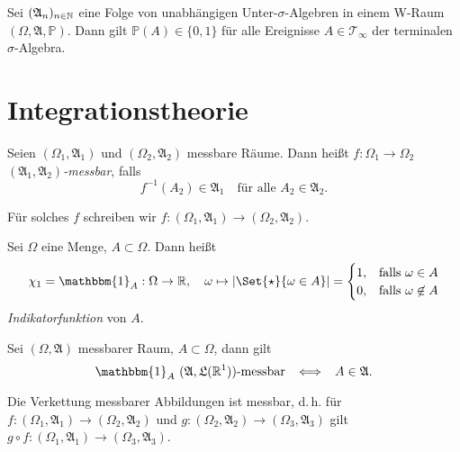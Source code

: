 \documentclass{cheat-sheet}
\newcommand{\Alg}{\mathfrak{A}} %
\newcommand{\LebAlg}{\mathfrak{L}} %
\renewcommand{\P}{\mathbb{P}} %
\newcommand{\ind}{\mathbbm{1}} %
\begin{document}

\begin{satz}
  Sei $(\Alg_n)_{n \in \N}$ eine Folge von unabhängigen Unter-$\sigma$-Algebren in einem W-Raum $(\Omega, \Alg, \P)$. Dann gilt $\P(A) \in \{ 0, 1 \}$ für alle Ereignisse $A \in \mathcal{T}_\infty$ der terminalen $\sigma$-Algebra.
\end{satz}


\section{Integrationstheorie}


\begin{defn}
  Seien $(\Omega_1, \Alg_1)$ und $(\Omega_2, \Alg_2)$ messbare Räume. Dann heißt $f : \Omega_1 \to \Omega_2$ \emph{$(\Alg_1, \Alg_2)$-messbar}, falls
  \[ f^{-1}(A_2) \in \Alg_1 \quad \text{für alle } A_2 \in \Alg_2. \]
\end{defn}

\begin{nota}
  Für solches $f$ schreiben wir $f : (\Omega_1, \Alg_1) \to (\Omega_2, \Alg_2)$.
\end{nota}

\begin{nota}
  Sei $\Omega$ eine Menge, $A \subset \Omega$. Dann heißt
  \[ \chi_1 = \ind_A : \Omega \to \R, \quad \omega \mapsto \abs{\Set{ \star }{ \omega \in A }} =
  \begin{cases}
    1, & \text{falls } \omega \in A \\
    0, & \text{falls } \omega \not\in A
  \end{cases} \]
  \emph{Indikatorfunktion} von $A$.
\end{nota}

\begin{beobachtung}
  Sei $(\Omega, \Alg)$ messbarer Raum, $A \subset \Omega$, dann gilt
  \[ \ind_A \text{ $(\Alg, \LebAlg(\R^1))$-messbar} \enspace \iff \enspace A \in \Alg. \]
\end{beobachtung}



\begin{lem}
  Die Verkettung messbarer Abbildungen ist messbar, d.\,h. für $f : (\Omega_1, \Alg_1) \to (\Omega_2, \Alg_2)$ und $g : (\Omega_2, \Alg_2) \to (\Omega_3, \Alg_3)$ gilt $g \circ f : (\Omega_1, \Alg_1) \to (\Omega_3, \Alg_3)$.
\end{lem}
\end{document}
